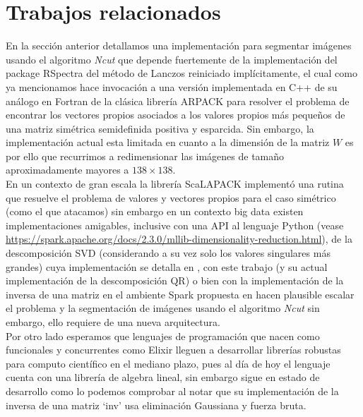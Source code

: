 \documentclass[conference]{IEEEtran}
\begin{document}
\section{Trabajos relacionados}
En la sección anterior detallamos una implementación para segmentar imágenes usando el algoritmo \textit{Ncut} que depende fuertemente de la implementación del package RSpectra \cite{RSpectra} del método de Lanczos reiniciado implícitamente, el cual como ya mencionamos hace invocación a una versión implementada en C++ de su análogo en Fortran de la clásica librería ARPACK \cite{Arpack} para resolver el problema de encontrar los vectores propios asociados a los valores propios más pequeños de una matriz simétrica semidefinida positiva y esparcida. Sin embargo, la implementación actual esta limitada en cuanto a la dimensión de la matriz $W$ es por ello que recurrimos a redimensionar las imágenes de tamaño aproximadamente mayores a $138 \times 138$. \\
En un contexto de gran escala la librería ScaLAPACK \cite{ScaLAPACK} implementó una rutina que resuelve el problema de valores y vectores propios para el caso simétrico (como el que atacamos) sin embargo en un contexto big data existen implementaciones amigables, inclusive con una API al lenguaje Python (vease  \url{https://spark.apache.org/docs/2.3.0/mllib-dimensionality-reduction.html}), de la descomposición SVD (considerando a su vez solo los valores singulares más grandes) cuya implementación se detalla en \cite{MatrixSpark}, con este trabajo (y su actual implementación de la descomposición QR) o bien con la implementación de la inversa de una matriz en el ambiente Spark propuesta en \cite{Sparkbased} hacen plausible escalar el problema y la segmentación de imágenes usando el algoritmo \textit{Ncut} sin embargo, ello requiere de una nueva arquitectura. \\
Por otro lado esperamos que lenguajes de programación que nacen como funcionales y concurrentes como Elixir \cite{Elixir} lleguen a desarrollar librerías robustas para computo científico en el mediano plazo, pues al día de hoy el lenguaje cuenta con una librería de algebra lineal, sin embargo sigue en estado de desarrollo \cite{ElixirLib} como lo podemos comprobar al notar que su implementación de la inversa de una matriz ‘inv’ usa eliminación Gaussiana y fuerza bruta.   
\end{document}
